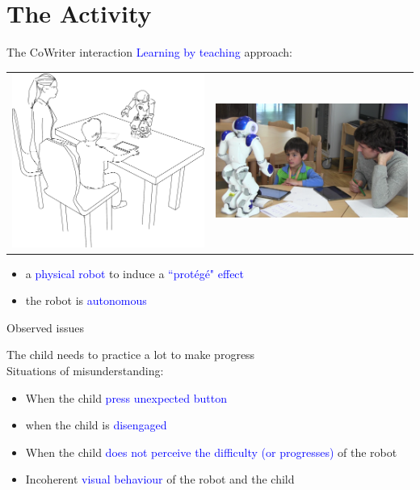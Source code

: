 \documentclass[compress]{beamer}
\renewcommand{\bf}{\Medium}
\begin{document}
\section*{The Activity}
\begin{frame}{The CoWriter interaction}
    \centering
    \textcolor{blue}{Learning by teaching} approach:
    \begin{tabular}{c c}
    \includegraphics[width=0.5\columnwidth]{experimental_setup}
    &
    \includegraphics[width=0.45\columnwidth]{realSetup}
    \end{tabular}
    \begin{itemize}
    \item a \textcolor{blue}{physical robot} to induce a \textcolor{blue}{``prot\'eg\'e" effect}
    \item the robot is \textcolor{blue}{autonomous}
    \end{itemize}
\end{frame}

\begin{frame}{Observed issues}

{\bf The child needs to practice a lot to make progress}\\
{\bf Situations of misunderstanding}:
\begin{itemize}
\item When the child \textcolor{blue}{press unexpected button}
\item when the child is \textcolor{blue}{disengaged}
\item When the child \textcolor{blue}{does not perceive the difficulty (or progresses)} of the robot 
\item Incoherent \textcolor{blue}{visual behaviour} of the robot and the child 
\end{itemize}
\end{frame}
\end{document}
